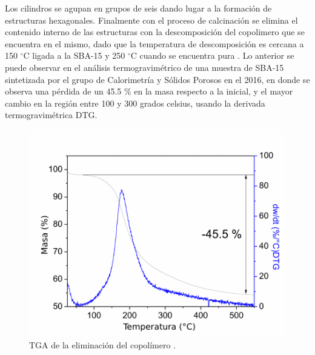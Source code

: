 \documentclass[fleqn, 12pt]{SelfArx}
\begin{document}
Los cilindros se agupan en grupos de seis dando lugar a la formaci\'on de estructuras hexagonales. Finalmente con el proceso de calcinaci\'on se elimina el contenido interno de las estructuras con la descomposici\'on del copolimero que se encuentra en el mismo, dado que la temperatura de descomposici\'on es cercana a 150 $^\circ$C ligada a la SBA-15 y 250 $^\circ$C cuando se encuentra pura \cite{zhao_1998}. Lo anterior se puede observar en el an\'alisis termogravim\'etrico de una muestra de SBA-15 sintetizada por el grupo de Calorimetr\'ia y S\'olidos Porosos en el 2016, en donde se observa una p\'erdida de un 45.5 \% en la masa respecto a la inicial, y el mayor cambio en la regi\'on entre 100 y 300 grados celsius, usando la derivada termogravim\'etrica DTG.
\begin{figure}[h]
	\centering
	\includegraphics[width=\linewidth]{structures/TGA-calcination.pdf}
	\caption{TGA de la eliminaci\'on del copol\'imero \cite{melendez_murillo_ramirez_2016}.}
	\label{fig: TGA-calcination}
\end{figure}
\pagebreak
\end{document}
